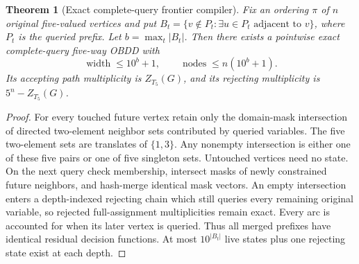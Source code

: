\documentclass[11pt]{article}
\newtheorem{theorem}{Theorem}
\begin{document}
\begin{theorem}[Exact complete-query frontier compiler]
Fix an ordering $\pi$ of $n$ original five-valued vertices and put
$B_t=\{v\notin P_t:\exists u\in P_t\text{ adjacent to }v\}$, where
$P_t$ is the queried prefix. Let $b=\max_t|B_t|$. Then there exists
a pointwise exact complete-query five-way OBDD with
\[
\operatorname{width}\le10^b+1,\qquad
\operatorname{nodes}\le n(10^b+1).
\]
Its accepting path multiplicity is $Z_{T_5}(G)$, and its rejecting
multiplicity is $5^n-Z_{T_5}(G)$.
\end{theorem}
\begin{proof}
For every touched future vertex retain only the domain-mask
intersection of directed two-element neighbor sets contributed by
queried variables. The five two-element sets are translates of
$\{1,3\}$. Any nonempty intersection is either one of these five
pairs or one of five singleton sets. Untouched vertices need no state.
On the next query check membership, intersect masks of newly
constrained future neighbors, and hash-merge identical mask vectors.
An empty intersection enters a depth-indexed rejecting chain which
still queries every remaining original variable, so rejected
full-assignment multiplicities remain exact. Every arc is accounted
for when its later vertex is queried. Thus all merged prefixes have
identical residual decision functions. At most $10^{|B_t|}$ live
states plus one rejecting state exist at each depth.
\end{proof}
\end{document}

